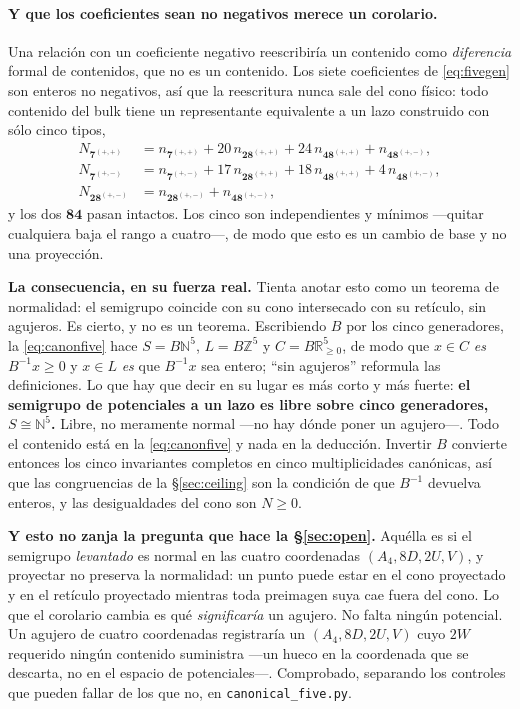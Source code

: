 \documentclass[11pt,a4paper]{article}
\newcommand{\ZZ}{\mathbb{Z}}
\newcommand{\NN}{\mathbb{N}}
\newcommand{\RR}{\mathbb{R}}
\newcommand{\rep}[1]{\mathbf{#1}}
\begin{document}
\paragraph{Y que los coeficientes sean no negativos merece un corolario.} Una relación con un
coeficiente negativo reescribiría un contenido como \emph{diferencia} formal de contenidos, que no
es un contenido. Los siete coeficientes de \eqref{eq:fivegen} son enteros no negativos, así que la
reescritura nunca sale del cono físico: todo contenido del bulk tiene un representante equivalente
a un lazo construido con sólo cinco tipos,
\begin{equation}\label{eq:canonfive}
\begin{aligned}
  N_{\rep7^{(+,+)}}&=n_{\rep7^{(+,+)}}+20\,n_{\rep{28}^{(+,+)}}+24\,n_{\rep{48}^{(+,+)}}+n_{\rep{48}^{(+,-)}},\\
  N_{\rep7^{(+,-)}}&=n_{\rep7^{(+,-)}}+17\,n_{\rep{28}^{(+,+)}}+18\,n_{\rep{48}^{(+,+)}}+4\,n_{\rep{48}^{(+,-)}},\\
  N_{\rep{28}^{(+,-)}}&=n_{\rep{28}^{(+,-)}}+n_{\rep{48}^{(+,-)}},
\end{aligned}
\end{equation}
y los dos $\rep{84}$ pasan intactos. Los cinco son independientes y mínimos ---quitar cualquiera
baja el rango a cuatro---, de modo que esto es un cambio de base y no una proyección.

\noindent\textbf{La consecuencia, en su fuerza real.} Tienta anotar esto como un teorema de
normalidad: el semigrupo coincide con su cono intersecado con su retículo, sin agujeros. Es
cierto, y no es un teorema. Escribiendo $B$ por los cinco generadores, la \eqref{eq:canonfive} hace
$S=B\NN^5$, $L=B\ZZ^5$ y $C=B\RR_{\ge0}^5$, de modo que $x\in C$ \emph{es} $B^{-1}x\ge0$ y
$x\in L$ \emph{es} que $B^{-1}x$ sea entero; ``sin agujeros'' reformula las definiciones. Lo que hay
que decir en su lugar es más corto y más fuerte: \textbf{el semigrupo de potenciales a un lazo es
libre sobre cinco generadores, $S\cong\NN^5$.} Libre, no meramente normal ---no hay dónde poner un
agujero---. Todo el contenido está en la \eqref{eq:canonfive} y nada en la deducción. Invertir $B$
convierte entonces los cinco invariantes completos en cinco multiplicidades canónicas, así que las
congruencias de la \S\ref{sec:ceiling} son la condición de que $B^{-1}$ devuelva enteros, y las
desigualdades del cono son $N\ge0$.

\noindent\textbf{Y esto no zanja la pregunta que hace la \S\ref{sec:open}.} Aquélla es si el
semigrupo \emph{levantado} es normal en las cuatro coordenadas $(A_4,8D,2U,V)$, y proyectar no
preserva la normalidad: un punto puede estar en el cono proyectado y en el retículo proyectado
mientras toda preimagen suya cae fuera del cono. Lo que el corolario cambia es qué
\emph{significaría} un agujero. No falta ningún potencial. Un agujero de cuatro coordenadas
registraría un $(A_4,8D,2U,V)$ cuyo $2W$ requerido ningún contenido suministra ---un hueco en la
coordenada que se descarta, no en el espacio de potenciales---. Comprobado, separando los controles
que pueden fallar de los que no, en \texttt{canonical\_\allowbreak five.py}.
\end{document}
